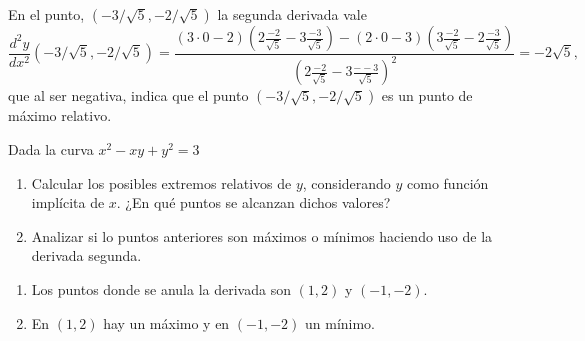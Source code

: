 {En el punto, $(-3/\sqrt{5},-2/\sqrt{5})$ la segunda derivada vale
\[
\frac{d^{2}y}{dx^{2}}(-3/\sqrt{5},-2/\sqrt{5})=
\frac{(3\cdot 0-2)(2\frac{-2}{\sqrt{5}}-3\frac{-3}{\sqrt{5}})-(2\cdot 0-3)(3\frac{-2}{\sqrt{5}}-2\frac{-3}{\sqrt{5}})}{(2\frac{-2}{\sqrt{5}}-3\frac{--3}{\sqrt{5}})^{2}} = -2\sqrt{5},
\]
que al ser negativa, indica que el punto $(-3/\sqrt{5},-2/\sqrt{5})$ es un punto de máximo relativo.
}


{Dada  la curva $x^2-xy+y^2=3$
\begin{enumerate}
\item Calcular los posibles extremos relativos de $y$, considerando $y$ como función implícita de $x$. ¿En qué puntos se alcanzan dichos valores?
\item Analizar si lo puntos anteriores son máximos o mínimos haciendo uso de la derivada segunda.
\end{enumerate}
}
{\begin{enumerate}
\item Los puntos donde se anula la derivada son $(1,2)$ y $(-1,-2)$.
\item En $(1,2)$ hay un máximo y en $(-1,-2)$ un mínimo.
\end{enumerate}
}
